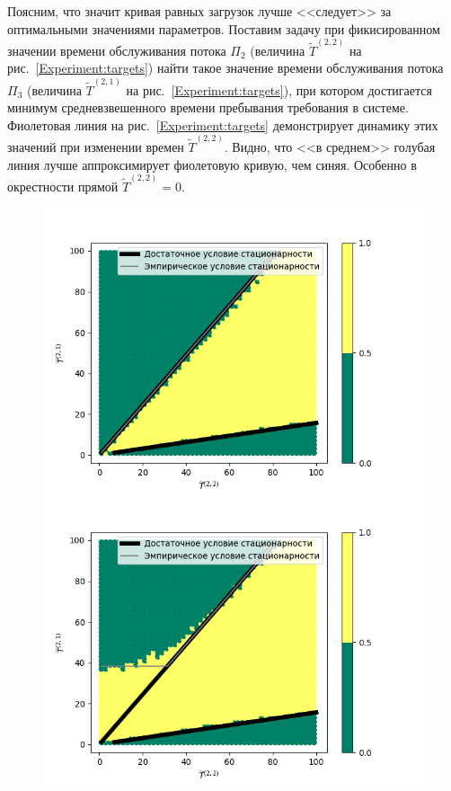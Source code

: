 Поясним, что значит кривая равных загрузок лучше <<следует>> за оптимальными значениями параметров. Поставим задачу при фикисированном значении времени обслуживания потока $\Pi_2$ (величина $\widetilde T^{(2,2)}$ на рис.~\ref{Experiment:targets}) найти такое значение времени обслуживания потока $\Pi_3$ (величина $\widetilde T^{(2,1)}$ на рис.~\ref{Experiment:targets}), при котором достигается минимум средневзвешенного времени пребывания требования в системе. Фиолетовая линия на рис.~\ref{Experiment:targets} демонстрирует динамику этих значений при изменении времен $\widetilde T^{(2,2)}$. Видно, что <<в среднем>> голубая линия лучше аппроксимирует фиолетовую кривую, чем синяя. Особенно в окрестности прямой $\widetilde T^{(2,2)}=0$. 

\begin{figure}
\begin{multicols}{2}
    \includegraphics[width=1.15\linewidth]{Pictures/0_1_thres_-1_fact.png}\par 
    \includegraphics[width=1.15\linewidth]{Pictures/0_1_thres_5_fact.png}\par 

\end{multicols}
\end{figure}
